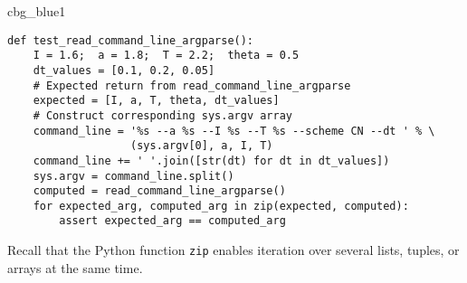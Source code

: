 \documentclass[graybox,sectrefs,envcountresetchap,open=right,final]{svmonodo}
\newenvironment{_cod_tight}[1]{
   \def\FrameCommand{\colorbox{#1}}
   \FrameRule0.6pt\MakeFramed {\FrameRestore}\vskip3mm}
   {\vskip0mm\endMakeFramed}
\newenvironment{cod}[1]{
\bgroup\rmfamily
\fboxsep=0mm\relax
\begin{_cod_tight}{#1}
\list{}{\parsep=-2mm\parskip=0mm\topsep=0pt\leftmargin=2mm
\rightmargin=2\leftmargin\leftmargin=4pt\relax}
\item\relax}
{\endlist\end{_cod_tight}\egroup}
\begin{document}
\begin{cod}{cbg_blue1}\begin{Verbatim}[numbers=none,fontsize=\fontsize{9pt}{9pt},baselinestretch=0.95,xleftmargin=2mm]
def test_read_command_line_argparse():
    I = 1.6;  a = 1.8;  T = 2.2;  theta = 0.5
    dt_values = [0.1, 0.2, 0.05]
    # Expected return from read_command_line_argparse
    expected = [I, a, T, theta, dt_values]
    # Construct corresponding sys.argv array
    command_line = '%s --a %s --I %s --T %s --scheme CN --dt ' % \ 
                   (sys.argv[0], a, I, T)
    command_line += ' '.join([str(dt) for dt in dt_values])
    sys.argv = command_line.split()
    computed = read_command_line_argparse()
    for expected_arg, computed_arg in zip(expected, computed):
        assert expected_arg == computed_arg
\end{Verbatim}
\end{cod}
\noindent
Recall that the Python function \texttt{zip} enables iteration over
several lists, tuples, or arrays at the same time.
\end{document}
